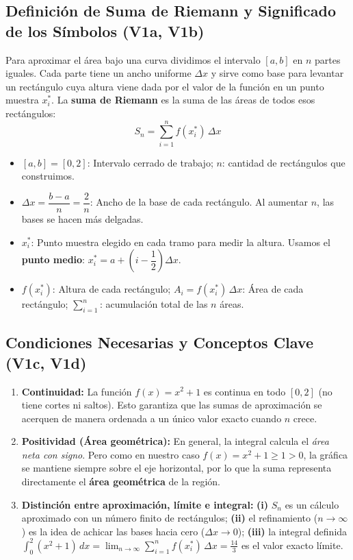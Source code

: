 \documentclass[10pt, a4paper]{article}
\begin{document}
\subsection{Definición de Suma de Riemann y Significado de los Símbolos (V1a, V1b)}
Para aproximar el área bajo una curva dividimos el intervalo $[a,b]$ en $n$ partes iguales. Cada parte tiene un ancho uniforme $\Delta x$ y sirve como base para levantar un rectángulo cuya altura viene dada por el valor de la función en un punto muestra $x_i^*$. La \textbf{suma de Riemann} es la suma de las áreas de todos esos rectángulos:
\[
S_n = \sum_{i=1}^{n} f(x_i^*)\,\Delta x
\]
\begin{itemize}[leftmargin=1.5em, itemsep=1pt, topsep=2pt]
    \item $[a,b] = [0,2]$: Intervalo cerrado de trabajo; $n$: cantidad de rectángulos que construimos.
    \item $\Delta x = \dfrac{b-a}{n} = \dfrac{2}{n}$: Ancho de la base de cada rectángulo. Al aumentar $n$, las bases se hacen más delgadas.
    \item $x_i^*$: Punto muestra elegido en cada tramo para medir la altura. Usamos el \textbf{punto medio}: $x_i^* = a + \left(i - \dfrac{1}{2}\right)\Delta x$.
    \item $f(x_i^*)$: Altura de cada rectángulo; $A_i = f(x_i^*)\,\Delta x$: Área de cada rectángulo; $\sum_{i=1}^n$: acumulación total de las $n$ áreas.
\end{itemize}

\subsection{Condiciones Necesarias y Conceptos Clave (V1c, V1d)}
\begin{enumerate}[leftmargin=1.5em, itemsep=2pt, topsep=2pt]
    \item \textbf{Continuidad:} La función $f(x) = x^2 + 1$ es continua en todo $[0,2]$ (no tiene cortes ni saltos). Esto garantiza que las sumas de aproximación se acerquen de manera ordenada a un único valor exacto cuando $n$ crece.
    \item \textbf{Positividad (Área geométrica):} En general, la integral calcula el \textit{área neta con signo}. Pero como en nuestro caso $f(x) = x^2 + 1 \geq 1 > 0$, la gráfica se mantiene siempre sobre el eje horizontal, por lo que la suma representa directamente el \textbf{área geométrica} de la región.
    \item \textbf{Distinción entre aproximación, límite e integral:}
    \textbf{(i)} $S_n$ es un cálculo aproximado con un número finito de rectángulos;
    \textbf{(ii)} el refinamiento ($n \to \infty$) es la idea de achicar las bases hacia cero ($\Delta x \to 0$);
    \textbf{(iii)} la integral definida $\int_0^2 (x^2+1)\,dx = \lim_{n\to\infty} \sum_{i=1}^n f(x_i^*)\,\Delta x = \frac{14}{3}$ es el valor exacto límite.
\end{enumerate}
\end{document}
